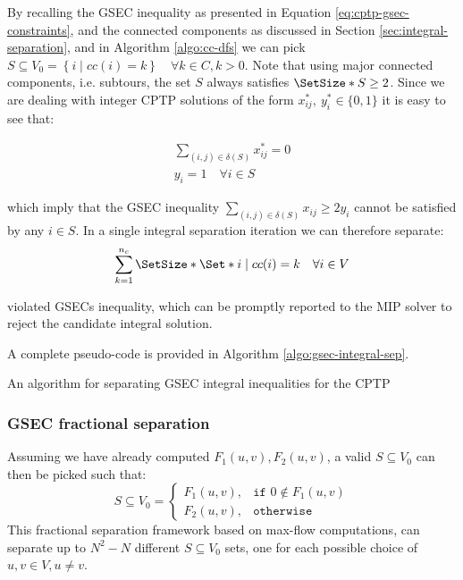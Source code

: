 By recalling the GSEC inequality as presented in Equation \eqref{eq:cptp-gsec-constraints}, and the connected components as discussed in Section \ref{sec:integral-separation}, and in Algorithm \ref{algo:cc-dfs} we can pick $S \subseteq V_0 = \left\{ i \mid cc(i) = k  \right\}   \quad \forall k \in C, k > 0$.
Note that using major connected components, i.e. subtours, the set $S$ always satisfies $\SetSize*{S} \ge 2$.
Since we are dealing with integer CPTP solutions of the form $x^*_{ij},\ y^*_{i} \in \{0, 1\}$ it is easy to see that:

\begin{align}
	\sum_{(i, j) \in \delta(S)} x^*_{ij} = 0 \\
	y_i =  1 \quad \forall i \in S
\end{align}

which imply that the GSEC inequality $\sum_{(i, j) \in \delta(S)} x_{ij} \ge 2 y_i$ cannot be satisfied by any $i \in S$.
In a single integral separation iteration we can therefore separate:
\begin{equation}
	\sum^{n_c}_{k = 1} \SetSize*{ \Set*{ i \mid cc(i) = k \quad \forall i \in V } }
\end{equation}

violated GSECs inequality, which can be promptly reported to the MIP solver to reject the candidate integral solution.

A complete pseudo-code is provided in Algorithm \ref{algo:gsec-integral-sep}.

\begin{algorithm}
	\caption{An algorithm for separating GSEC integral inequalities for the CPTP}
	\label{algo:gsec-integral-sep}
	
\end{algorithm}

\subsubsection{GSEC fractional separation}
\label{sec:impl-gsec-fractional-separation}

Assuming we have already computed $F_1(u, v), F_2(u, v)$, a valid $S \subseteq V_0$ can then be picked such that:
\begin{equation}
	S \subseteq V_0 =
	\begin{cases}
		F_1(u, v), & \texttt{if } 0 \notin F_1(u, v) \\
		F_2(u, v), & \texttt{otherwise}
	\end{cases}
\end{equation}
This fractional separation framework based on max-flow computations, can separate up to $N^2 - N$ different $S \subseteq V_0$ sets, one for each possible choice of $u, v \in V, u \ne v$.



